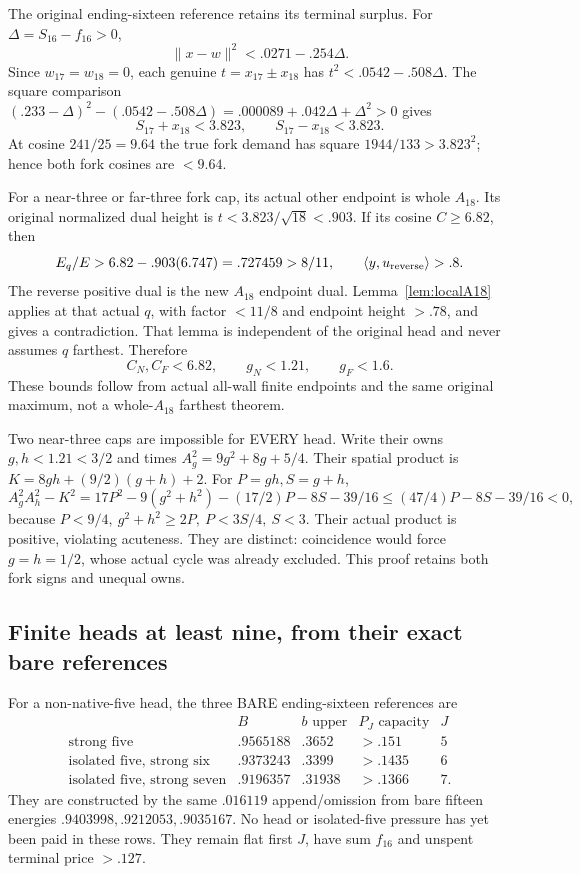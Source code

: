 \documentclass[11pt]{article}
\theoremstyle{definition}
\theoremstyle{remark}
\newcommand{\ip}[2]{\langle #1,#2\rangle}
\newcommand{\norm}[1]{\lVert #1\rVert}
\begin{document}
The original ending-sixteen reference retains its terminal surplus.
For \(\Delta=S_{16}-f_{16}>0\),
\[
 \norm{x-w}^2<.0271-.254\Delta .
\]
Since \(w_{17}=w_{18}=0\), each genuine
\(t=x_{17}\pm x_{18}\) has \(t^2<.0542-.508\Delta\).
The square comparison
\((.233-\Delta)^2-(.0542-.508\Delta)
=.000089+.042\Delta+\Delta^2>0\)
gives
\[
 S_{17}+x_{18}<3.823,\qquad S_{17}-x_{18}<3.823.
\]
At cosine \(241/25=9.64\) the true fork demand has square
\(1944/133>3.823^2\); hence both fork cosines are \(<9.64\).

For a near-three or far-three fork cap, its actual other endpoint is
whole \(A_{18}\). Its original normalized dual height is
\(t<3.823/\sqrt{18}<.903\).
If its cosine \(C\geq6.82\), then
\[
 E_q/E>6.82-.903(6.747)=.727459>8/11,
 \qquad \ip y{u_{\rm reverse}}>.8 .
\]
The reverse positive dual is the new \(A_{18}\) endpoint dual.
Lemma~\ref{lem:localA18} applies at that actual \(q\), with factor
\(<11/8\) and endpoint height \(>.78\), and gives a contradiction.
That lemma is independent of the original head and never assumes
\(q\) farthest. Therefore
\[
 C_N,C_F<6.82,\qquad g_N<1.21,\qquad g_F<1.6 .
\]
These bounds follow from actual all-wall finite endpoints and
the same original maximum, not a whole-\(A_{18}\) farthest theorem.

Two near-three caps are impossible for EVERY head.
Write their owns \(g,h<1.21<3/2\) and times
\(A_g^2=9g^2+8g+5/4\).
Their spatial product is
\(K=8gh+(9/2)(g+h)+2\).
For \(P=gh,S=g+h\),
\[
 A_g^2A_h^2-K^2
 =17P^2-9(g^2+h^2)-(17/2)P-8S-39/16
 \leq(47/4)P-8S-39/16<0 ,
\]
because \(P<9/4,\ g^2+h^2\geq2P,\ P<3S/4,\ S<3\).
Their actual product is positive, violating acuteness.
They are distinct: coincidence would force \(g=h=1/2\),
whose actual cycle was already excluded.
This proof retains both fork signs and unequal owns.

\subsection{Finite heads at least nine, from their exact bare references}
\label{app:D18finiteheadslarge}
For a non-native-five head, the three BARE ending-sixteen references
are
\[
\begin{array}{c|c|c|c|c}
 &B&b\text{ upper}&P_J\text{ capacity}&J\\ \hline
\text{strong five}&.9565188&.3652&>.151&5\\
\text{isolated five, strong six}&.9373243&.3399&>.1435&6\\
\text{isolated five, strong seven}&.9196357&.31938&>.1366&7 .
\end{array}
\]
They are constructed by the same \(.016119\) append/omission
from bare fifteen energies
\(.9403998,.9212053,.9035167\).
No head or isolated-five pressure has yet been paid in these rows.
They remain flat first \(J\), have sum \(f_{16}\) and unspent
terminal price \(>.127\).
\end{document}
